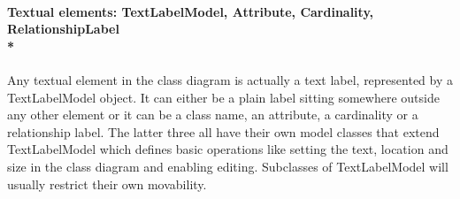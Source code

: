 \paragraph{\small{\tab Textual elements: TextLabelModel, Attribute, Cardinality, RelationshipLabel\\*}}

\hspace{-10pt}Any textual element in the class diagram is actually a text label, represented by a TextLabelModel object. It can either be a plain label sitting somewhere outside any other element or it can be a class name, an attribute, a cardinality or a relationship label. The latter three all have their own model classes that extend TextLabelModel which defines basic operations like setting the text, location and size in the class diagram and enabling editing. Subclasses of TextLabelModel will usually restrict their own movability.
